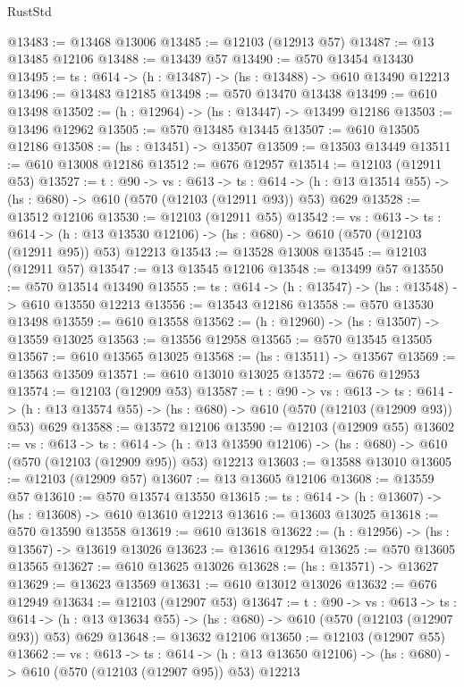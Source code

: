 \begin{lexlean}{RustStd}
\begin{coremodule}
@13483 := @13468 @13006
@13485 := @12103 (@12913 @57)
@13487 := @13 @13485 @12106
@13488 := @13439 @57
@13490 := @570 @13454 @13430
@13495 := {ts : @614} -> (h : @13487) -> (hs : @13488) -> @610 @13490 @12213
@13496 := @13483 @12185
@13498 := @570 @13470 @13438
@13499 := @610 @13498
@13502 := (h : @12964) -> (hs : @13447) -> @13499 @12186
@13503 := @13496 @12962
@13505 := @570 @13485 @13445
@13507 := @610 @13505 @12186
@13508 := (hs : @13451) -> @13507
@13509 := @13503 @13449
@13511 := @610 @13008 @12186
@13512 := @676 @12957
@13514 := @12103 (@12911 @53)
@13527 := {t : @90} ->
  {vs : @613} ->
  {ts : @614} -> (h : @13 @13514 @55) -> (hs : @680) -> @610 (@570 (@12103 (@12911 @93)) @53) @629
@13528 := @13512 @12106
@13530 := @12103 (@12911 @55)
@13542 := {vs : @613} ->
  {ts : @614} ->
  (h : @13 @13530 @12106) -> (hs : @680) -> @610 (@570 (@12103 (@12911 @95)) @53) @12213
@13543 := @13528 @13008
@13545 := @12103 (@12911 @57)
@13547 := @13 @13545 @12106
@13548 := @13499 @57
@13550 := @570 @13514 @13490
@13555 := {ts : @614} -> (h : @13547) -> (hs : @13548) -> @610 @13550 @12213
@13556 := @13543 @12186
@13558 := @570 @13530 @13498
@13559 := @610 @13558
@13562 := (h : @12960) -> (hs : @13507) -> @13559 @13025
@13563 := @13556 @12958
@13565 := @570 @13545 @13505
@13567 := @610 @13565 @13025
@13568 := (hs : @13511) -> @13567
@13569 := @13563 @13509
@13571 := @610 @13010 @13025
@13572 := @676 @12953
@13574 := @12103 (@12909 @53)
@13587 := {t : @90} ->
  {vs : @613} ->
  {ts : @614} -> (h : @13 @13574 @55) -> (hs : @680) -> @610 (@570 (@12103 (@12909 @93)) @53) @629
@13588 := @13572 @12106
@13590 := @12103 (@12909 @55)
@13602 := {vs : @613} ->
  {ts : @614} ->
  (h : @13 @13590 @12106) -> (hs : @680) -> @610 (@570 (@12103 (@12909 @95)) @53) @12213
@13603 := @13588 @13010
@13605 := @12103 (@12909 @57)
@13607 := @13 @13605 @12106
@13608 := @13559 @57
@13610 := @570 @13574 @13550
@13615 := {ts : @614} -> (h : @13607) -> (hs : @13608) -> @610 @13610 @12213
@13616 := @13603 @13025
@13618 := @570 @13590 @13558
@13619 := @610 @13618
@13622 := (h : @12956) -> (hs : @13567) -> @13619 @13026
@13623 := @13616 @12954
@13625 := @570 @13605 @13565
@13627 := @610 @13625 @13026
@13628 := (hs : @13571) -> @13627
@13629 := @13623 @13569
@13631 := @610 @13012 @13026
@13632 := @676 @12949
@13634 := @12103 (@12907 @53)
@13647 := {t : @90} ->
  {vs : @613} ->
  {ts : @614} -> (h : @13 @13634 @55) -> (hs : @680) -> @610 (@570 (@12103 (@12907 @93)) @53) @629
@13648 := @13632 @12106
@13650 := @12103 (@12907 @55)
@13662 := {vs : @613} ->
  {ts : @614} ->
  (h : @13 @13650 @12106) -> (hs : @680) -> @610 (@570 (@12103 (@12907 @95)) @53) @12213

\end{coremodule}
\end{lexlean}
